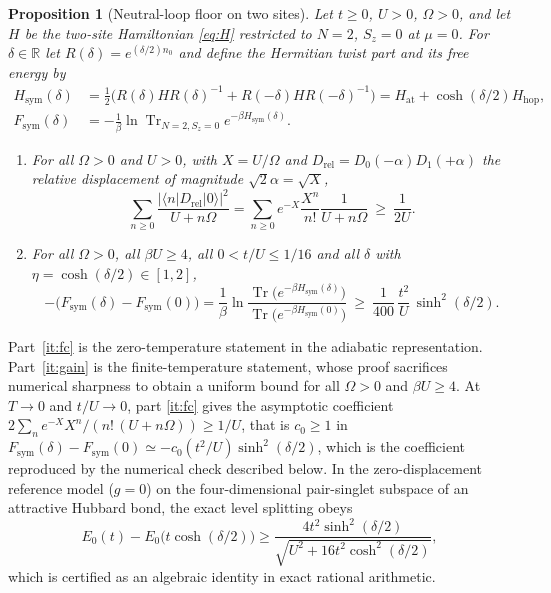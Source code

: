 \documentclass[11pt]{article}
\theoremstyle{plain}
\newtheorem{proposition}[theorem]{Proposition}
\theoremstyle{definition}
\DeclareMathOperator{\Tr}{Tr}
\begin{document}
\begin{proposition}[Neutral-loop floor on two sites]\label{prop:floor}
Let $t\ge0$, $U>0$, $\Omega>0$, and let $H$ be the two-site Hamiltonian
\eqref{eq:H} restricted to $N=2$, $S_z=0$ at $\mu=0$. For $\delta\in\mathbb{R}$
let $R(\delta)=e^{(\delta/2)n_0}$ and define the Hermitian twist part and its free
energy by
\begin{equation}\label{eq:hsym}
\begin{aligned}
H_{\mathrm{sym}}(\delta)&=\frac12\bigl(R(\delta)HR(\delta)^{-1}+R(-\delta)HR(-\delta)^{-1}\bigr)
=H_{\mathrm{at}}+\cosh(\delta/2)H_{\mathrm{hop}},\\
F_{\mathrm{sym}}(\delta)&=-\frac1\beta\ln\Tr_{N=2,S_z=0}e^{-\beta H_{\mathrm{sym}}(\delta)} .
\end{aligned}
\end{equation}
\begin{enumerate}
\item\label{it:fc} For all $\Omega>0$ and $U>0$, with $X=U/\Omega$ and
$D_{\mathrm{rel}}=D_0(-\alpha)D_1(+\alpha)$ the relative displacement of
magnitude $\sqrt2\alpha=\sqrt X$,
\begin{equation}\label{eq:fc}
\sum_{n\ge0}\frac{\bigl|\langle n|D_{\mathrm{rel}}|0\rangle\bigr|^{2}}{U+n\Omega}
=\sum_{n\ge0}e^{-X}\frac{X^{n}}{n!}\frac{1}{U+n\Omega}\ \ge\ \frac{1}{2U} .
\end{equation}
\item\label{it:gain} For all $\Omega>0$, all $\beta U\ge4$, all $0<t/U\le1/16$
and all $\delta$ with $\eta=\cosh(\delta/2)\in[1,2]$,
\begin{equation}\label{eq:gain}
-\bigl(F_{\mathrm{sym}}(\delta)-F_{\mathrm{sym}}(0)\bigr)
=\frac1\beta\ln\frac{\Tr\bigl(e^{-\beta H_{\mathrm{sym}}(\delta)}\bigr)}
{\Tr\bigl(e^{-\beta H_{\mathrm{sym}}(0)}\bigr)}
\ \ge\ \frac{1}{400}\,\frac{t^{2}}{U}\,\sinh^{2}(\delta/2) .
\end{equation}
\end{enumerate}
\end{proposition}

Part~\ref{it:fc} is the zero-temperature statement in the adiabatic
representation. Part~\ref{it:gain} is the finite-temperature statement, whose
proof sacrifices numerical sharpness to obtain a uniform bound for all
$\Omega>0$ and $\beta U\ge4$. At $T\to0$ and $t/U\to0$, part
\ref{it:fc} gives the asymptotic coefficient
$2\sum_{n}e^{-X}X^{n}/(n!\,(U+n\Omega))\ge1/U$, that is $c_0\ge1$ in
$F_{\mathrm{sym}}(\delta)-F_{\mathrm{sym}}(0)\simeq-c_0(t^{2}/U)\sinh^{2}(\delta/2)$,
which is the coefficient reproduced by the numerical check described below. In the
zero-displacement reference model ($g=0$) on the four-dimensional pair-singlet
subspace of an attractive Hubbard bond, the exact level splitting obeys
\begin{equation}\label{eq:hubbard}
E_0(t)-E_0\bigl(t\cosh(\delta/2)\bigr)\ge\frac{4t^{2}\sinh^{2}(\delta/2)}
{\sqrt{U^{2}+16t^{2}\cosh^{2}(\delta/2)}} ,
\end{equation}
which is certified as an algebraic identity in exact rational arithmetic.
\end{document}
